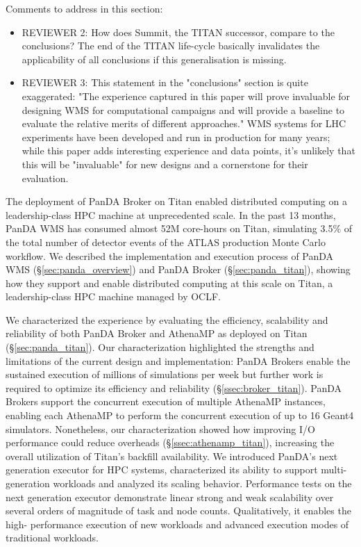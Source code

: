 \ifreview
Comments to address in this section:
\begin{itemize}
	\color{red} 
	\item REVIEWER 2: How does Summit, the TITAN successor, compare to the
	conclusions? The end of the TITAN life-cycle basically invalidates the
	applicability of all conclusions if this generalisation is missing.
	\item REVIEWER 3: This statement in the "conclusions" section is quite
	exaggerated: "The experience captured in this paper will prove invaluable
	for designing WMS for computational campaigns and will provide a baseline
	to evaluate the relative merits of different approaches." WMS systems for
	LHC experiments have been developed and run in production for many years;
	while this paper adds interesting experience and data points, it's
	unlikely that this will be "invaluable" for new designs and a cornerstone
	for their evaluation.
\end{itemize}
\fi

The deployment of PanDA Broker on Titan enabled distributed computing on a
leadership-class HPC machine at unprecedented scale. In the past 13 months,
PanDA WMS has consumed almost 52M core-hours on Titan, simulating 3.5\% of
the total number of detector events of the ATLAS production Monte Carlo
workflow. We described the implementation and execution process of PanDA WMS
(\S\ref{sec:panda_overview}) and PanDA Broker (\S\ref{sec:panda_titan}),
showing how they support and enable distributed computing at this scale on
Titan, a leadership-class HPC machine managed by OCLF.

We characterized the experience by evaluating the efficiency, scalability and
reliability of both PanDA Broker and AthenaMP as deployed on Titan
(\S\ref{sec:panda_titan}). Our characterization highlighted the strengths and
limitations of the current design and implementation: PanDA Brokers enable
the sustained execution of millions of simulations per week but further work
is required to optimize its efficiency and reliability
(\S\ref{ssec:broker_titan}). PanDA Brokers support the concurrent execution
of multiple AthenaMP instances, enabling each AthenaMP to perform the
concurrent execution of up to 16 Geant4 simulators. Nonetheless, our
characterization showed how improving I/O performance could reduce overheads
(\S\ref{ssec:athenamp_titan}), increasing the overall utilization of Titan's
backfill availability. We introduced PanDA's next generation executor for HPC
systems, characterized its ability to support multi-generation workloads and
analyzed its scaling behavior.  Performance tests on the next generation
executor demonstrate linear strong and weak scalability over several orders
of magnitude  of task and node counts.  Qualitatively, it enables the high-
performance execution of new workloads and advanced execution modes of
traditional workloads.

